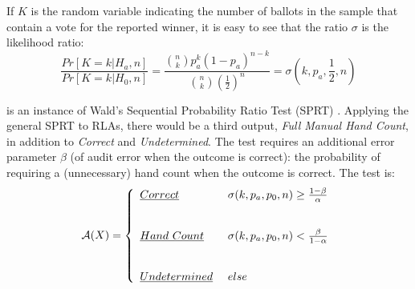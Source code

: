 If $K$ is the random variable indicating the number of ballots in the sample that contain a vote for the reported winner, it is easy to see that the ratio $\sigma$ is the likelihood ratio:
$$
\frac{Pr[K=k|H_a,n]}{Pr[K=k|H_0,n]}= \frac{\binom{n}{k}p_a^{k} (1-p_a)^{n-k}}{\binom{n}{k}(\frac{1}{2})^n} =\sigma(k, p_a, \frac{1}{2}, n)
$$

\begin{comment}
\begin{definition}[$(\alpha,p)$-\BRAVO ]\label{def:bravo}  An audit $\mathcal{A}$ is the \B~$(\alpha, p)$-\BRAVO audit iff the following stopping condition is tested at each ballot draw. If the sample $X$ is of size $n$ and has $k$ ballots for the winner,  
\begin{equation}
    \mathcal{A}(X) =  \left\{ \begin{array}{ll} \text{Correct} & ~\sigma(k, p, \frac{1}{2}, n) 
        \geq \frac{1}{\alpha}\\
        Undetermined & ~else 
    \end{array}
    \right .
    \label{eqn:bravo}
\end{equation}
\end{definition}
\end{comment}

\BRAVO is an instance of Wald's Sequential Probability Ratio Test (SPRT) \cite{wald}. Applying the general SPRT to RLAs, there would be a third output, {\em Full Manual Hand Count}, in addition to {\em Correct} and {\em Undetermined}. The test requires an additional error parameter $\beta$ (of audit error when the outcome is correct): the probability of requiring a (unnecessary) hand count when the outcome is correct. The test is:
\begin{equation}
    \mathcal{A}(X) =  \left\{ \begin{array}{ll} \emph{Correct} & ~\sigma(k, p_a, p_0, n) 
        \geq \frac{1-\beta}{\alpha}\\ \\ \\
       \emph{Hand~Count} & ~\sigma(k, p_a, p_0, n) 
        < \frac{\beta}{1-\alpha}\\ \\ \\
        \emph{Undetermined} & ~else 
    \end{array}
    \right .
    \label{eqn:wald}
\end{equation}


